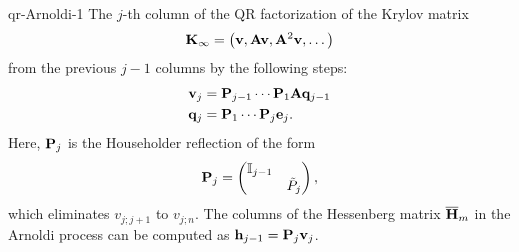 \begin{Lemma}{qr-Arnoldi-1}
  The $j$-th column of the QR factorization of the Krylov matrix
  \begin{gather}
    \mathbf K_\infty = \bigl(\mathbf v,\mathbf A\mathbf v,\mathbf A^2\mathbf v,\dots\bigr)
  \end{gather}
  from the previous $j-1$ columns by the following steps:
  \begin{align}
    \label{eq:Arnoldi-Householder:1}
    \mathbf v_j &= \mathbf P_{j-1}\cdots \mathbf P_1\mathbf A\mathbf q_{j-1}\\
    \label{eq:Arnoldi-Householder:2}
    \mathbf q_j &= \mathbf P_1\cdots \mathbf P_j\mathbf e_j.
  \end{align}
  Here, $\mathbf P_j$ is the Householder reflection of the form
  \begin{gather}
    \label{eq:Arnoldi-Householder:3}
    \mathbf P_j =
    \begin{pmatrix}
      \mathbb I_{j-1}\\& \tilde P_{j}
    \end{pmatrix},
  \end{gather}
  which eliminates $v_{j;j+1}$ to $v_{j;n}$.  The columns of the
  Hessenberg matrix $\overline{\mathbf H}_m$ in the Arnoldi process can be computed
  as $\mathbf h_{j-1} = \mathbf P_j\mathbf v_j$.
\end{Lemma}

